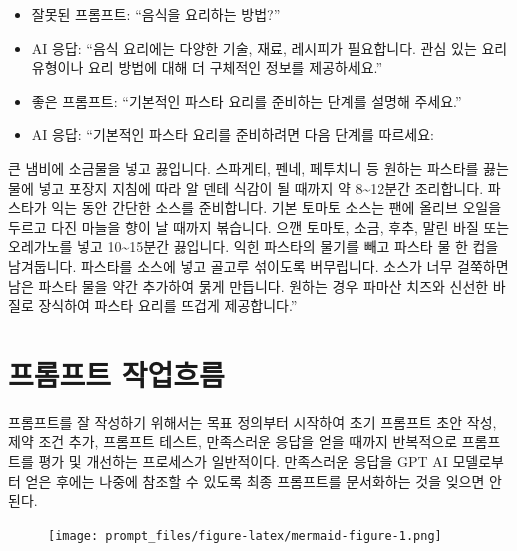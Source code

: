 \documentclass[
  letterpaper,
]{book}
\providecommand{\tightlist}{%
  \setlength{\itemsep}{0pt}\setlength{\parskip}{0pt}}\usepackage{longtable,booktabs,array}
\begin{document}
\begin{itemize}
\tightlist
\item
  잘못된 프롬프트: ``음식을 요리하는 방법?''
\item
  AI 응답: ``음식 요리에는 다양한 기술, 재료, 레시피가 필요합니다. 관심
  있는 요리 유형이나 요리 방법에 대해 더 구체적인 정보를 제공하세요.''
\end{itemize}

\begin{itemize}
\tightlist
\item
  좋은 프롬프트: ``기본적인 파스타 요리를 준비하는 단계를 설명해
  주세요.''
\item
  AI 응답: ``기본적인 파스타 요리를 준비하려면 다음 단계를 따르세요:
\end{itemize}

큰 냄비에 소금물을 넣고 끓입니다. 스파게티, 펜네, 페투치니 등 원하는
파스타를 끓는 물에 넣고 포장지 지침에 따라 알 덴테 식감이 될 때까지 약
8\textasciitilde12분간 조리합니다. 파스타가 익는 동안 간단한 소스를
준비합니다. 기본 토마토 소스는 팬에 올리브 오일을 두르고 다진 마늘을
향이 날 때까지 볶습니다. 으깬 토마토, 소금, 후추, 말린 바질 또는
오레가노를 넣고 10\textasciitilde15분간 끓입니다. 익힌 파스타의 물기를
빼고 파스타 물 한 컵을 남겨둡니다. 파스타를 소스에 넣고 골고루 섞이도록
버무립니다. 소스가 너무 걸쭉하면 남은 파스타 물을 약간 추가하여 묽게
만듭니다. 원하는 경우 파마산 치즈와 신선한 바질로 장식하여 파스타 요리를
뜨겁게 제공합니다.''

\hypertarget{uxd504uxb86cuxd504uxd2b8-uxc791uxc5c5uxd750uxb984}{%
\section{프롬프트
작업흐름}\label{uxd504uxb86cuxd504uxd2b8-uxc791uxc5c5uxd750uxb984}}

프롬프트를 잘 작성하기 위해서는 목표 정의부터 시작하여 초기 프롬프트
초안 작성, 제약 조건 추가, 프롬프트 테스트, 만족스러운 응답을 얻을
때까지 반복적으로 프롬프트를 평가 및 개선하는 프로세스가 일반적이다.
만족스러운 응답을 GPT AI 모델로부터 얻은 후에는 나중에 참조할 수 있도록
최종 프롬프트를 문서화하는 것을 잊으면 안 된다.

\begin{figure}[H]

{\centering \texttt{[image: prompt\_files/figure-latex/mermaid-figure-1.png]}

}

\end{figure}
\end{document}
